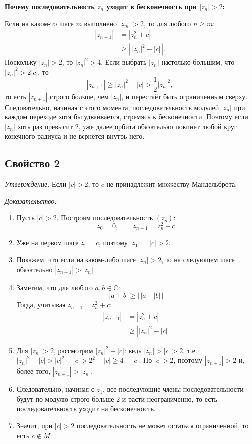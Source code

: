 \begin{section_1}
\vspace{1em}

\textbf{Почему последовательность $z_n$ уходит в бесконечность при $|z_n| > 2$:}

Если на каком-то шаге $m$ выполнено $|z_m| > 2$, то для любого $n \geq m$:
\begin{align*}
    |z_{n+1}| &= |z_n^2 + c| \\
              &\geq \left|\,|z_n|^2 - |c|\,\right|.
\end{align*}
Поскольку $|z_n| > 2$, то $|z_n|^2 > 4$. Если выбрать $|z_n|$ настолько большим, что $|z_n|^2 > 2|c|$, то
\[
    |z_{n+1}| \geq |z_n|^2 - |c| > \frac{1}{2}|z_n|^2,
\]
то есть $|z_{n+1}|$ строго больше, чем $|z_n|$, и перестаёт быть ограниченным сверху. Следовательно, начиная с этого момента, последовательность модулей $|z_n|$ при каждом переходе хотя бы удваивается, стремясь к бесконечности. Поэтому если $|z_n|$ хоть раз превысит 2, уже далее орбита обязательно покинет любой круг конечного радиуса и не вернётся внутрь него.


\vspace{1.5em}
\subsection{Свойство 2}


\textit{Утверждение:} Если $|c| > 2$, то $c$ не принадлежит множеству Мандельброта.

\textit{Доказательство:}

\begin{enumerate}
    \item Пусть $|c| > 2$. Построим последовательность $(z_n)$:
    \[
        z_0 = 0,\qquad z_{n+1} = z_n^2 + c
    \]
    \item Уже на первом шаге $z_1 = c$, поэтому $|z_1| = |c| > 2$.
    \item Покажем, что если на каком-либо шаге $|z_n| > 2$, то на следующем шаге обязательно $|z_{n+1}| > |z_n|$.
    \item Заметим, что для любого $a, b \in \mathbb{C}$:
    \[
        |a + b| \geq |\,|a| - |b|\,|
    \]
    Тогда, учитывая $z_{n+1} = z_n^2 + c$:
 \begin{align*}
    |z_{n+1}| &= |z_n^2 + c| \\
              &\geq \left||z_n|^2 - |c|\right|
\end{align*}
    \item Для $|z_n| > 2$, рассмотрим $|z_n|^2 - |c|$: ведь $|z_n| > |c| > 2$, т.е. $|z_n|^2 - |c| > |c|^2 - |c| > 2^2 - |c| \geq 4 - |c|$. Но $|c| > 2$, поэтому $|z_{n+1}| > 2$ и, более того, $|z_{n+1}| > |z_n|$.
    \item Следовательно, начиная с $z_1$, все последующие члены последовательности будут по модулю строго больше $2$ и расти неограниченно, то есть последовательность уходит на бесконечность.
    \item Значит, при $|c| > 2$ последовательность не может остаться ограниченной, то есть $c \notin M$.
\end{enumerate}

\end{section_1}